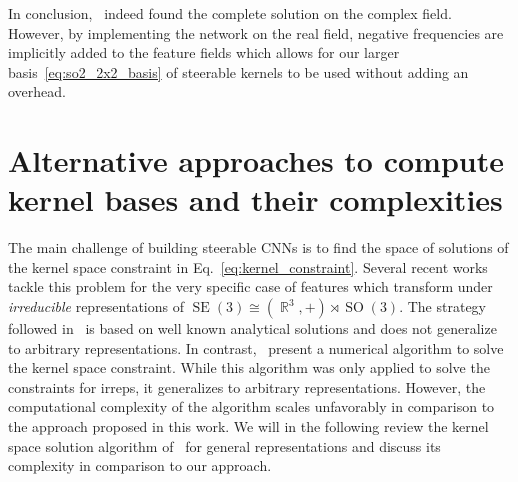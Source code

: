 \documentclass{article}
\DeclareMathOperator*{\R}{\mathbb{R}}
\newcommand{\SE}[1]{\ensuremath{\operatorname{SE}(#1)}}
\newcommand{\SO}[1]{\ensuremath{\operatorname{SO}(#1)}}
\begin{document}
In conclusion,~\cite{Worrall2017-HNET} indeed found the complete solution on the complex field.
However, by implementing the network on the real field, negative frequencies are implicitly added to the feature fields which allows for our larger basis~\eqref{eq:so2_2x2_basis} of steerable kernels to be used without adding an overhead.

  	
\section{Alternative approaches to compute kernel bases and their complexities}
\label{apx:comparison_SE3Nets}

The main challenge of building steerable CNNs is to find the space of solutions of the kernel space constraint in Eq.~\ref{eq:kernel_constraint}.
Several recent works tackle this problem for the very specific case of features which transform under \textit{irreducible} representations of $\SE3\cong(\R^3,+)\rtimes\SO3$.
The strategy followed in~\cite{TensorFieldNets,Kondor2018-NBN,kondorClebschGordanNets2018,anderson2019cormorant} is based on well known analytical solutions and does not generalize to arbitrary representations.
In contrast,~\cite{3d_steerableCNNs} present a numerical algorithm to solve the kernel space constraint.
While this algorithm was only applied to solve the constraints for irreps, it generalizes to arbitrary representations.
However, the computational complexity of the algorithm scales unfavorably in comparison to the approach proposed in this work.
We will in the following review the kernel space solution algorithm of~\cite{3d_steerableCNNs} for general representations and discuss its complexity in comparison to our approach.
\end{document}
